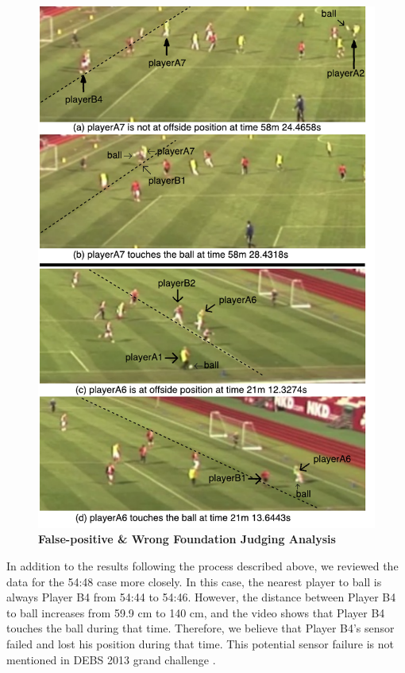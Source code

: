 \begin{figure}[!htbp]
	\centering
	\includegraphics[width=5in]{img/5-fpa}
	\caption{\textbf{False-positive \& Wrong Foundation Judging Analysis}}
	\label{fig:fpa}
\end{figure}

In addition to the results following the process described above, we reviewed the data for the 54:48 case more closely. 
In this case, the nearest player to ball is always Player B4 from 54:44 to 54:46.
However, the distance between Player B4 to ball increases from 59.9 cm to 140 cm, and the video shows that Player B4 touches the ball during that time.
Therefore, we believe that Player B4's sensor failed and lost his position during that time.
This potential sensor failure is not mentioned in DEBS 2013 grand challenge \cite{mutschler2013debs}. 

